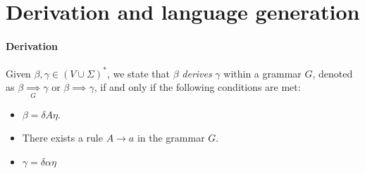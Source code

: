 \section{Derivation and language generation}

\paragraph*{Derivation}
 Given $\beta, \gamma \in (V \cup \Sigma)^{\ast}$, we state that $\beta$ \emph{derives} $\gamma$ within a grammar $G$, denoted as $\beta\underset{G}{\implies}\gamma$ or $\beta\implies\gamma$,  if and only if the following conditions are met:
\begin{itemize}
    \item $\beta=\delta A \eta$. 
    \item There exists a rule $A\rightarrow a$ in the grammar $G$. 
    \item $\gamma=\delta\alpha\eta$
\end{itemize}

